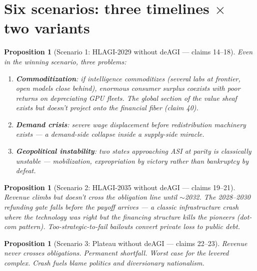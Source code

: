 \documentclass[11pt,a4paper]{article}
\newtheorem{proposition}[definition]{Proposition}
\begin{document}

\section{Six scenarios: three timelines $\times$ two variants}
\label{sec:scenarios}

\begin{proposition}[Scenario 1: HLAGI-2029 without deAGI --- claims 14--18]
\label{prop:s1}
Even in the winning scenario, three problems:
\begin{enumerate}
\item \textbf{Commoditization}: if intelligence commoditizes (several
  labs at frontier, open models close behind), enormous consumer surplus
  coexists with poor returns on depreciating GPU fleets. The global
  section of the value sheaf exists but doesn't project onto the
  financial fiber (claim 40).
\item \textbf{Demand crisis}: severe wage displacement before
  redistribution machinery exists --- a demand-side collapse inside
  a supply-side miracle.
\item \textbf{Geopolitical instability}: two states approaching ASI at
  parity is classically unstable --- mobilization, expropriation by
  victory rather than bankruptcy by defeat.
\end{enumerate}
\end{proposition}

\begin{proposition}[Scenario 2: HLAGI-2035 without deAGI --- claims 19--21]
\label{prop:s2}
Revenue climbs but doesn't cross the obligation line until $\sim$2032.
The 2028--2030 refunding gate falls before the payoff arrives --- a
classic infrastructure crash where the technology was right but the
financing structure kills the pioneers (dot-com pattern). Too-strategic-to-fail
bailouts convert private loss to public debt.
\end{proposition}

\begin{proposition}[Scenario 3: Plateau without deAGI --- claims 22--23]
\label{prop:s3}
Revenue never crosses obligations. Permanent shortfall. Worst case for
the levered complex. Crash fuels blame politics and diversionary
nationalism.
\end{proposition}

\end{document}
